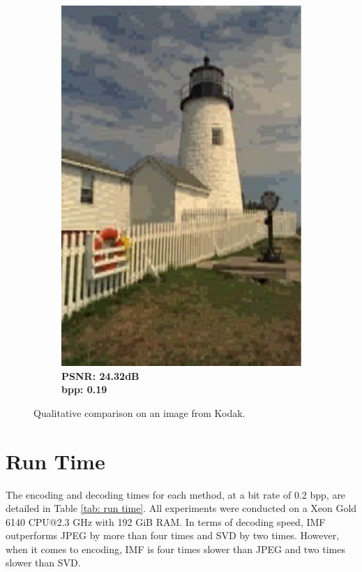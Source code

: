 \begin{figure}[t]
\begin{subfigure}{.2\textwidth}
		\includegraphics[width=.95\textwidth]{figures/kodim19_IMF_bpp_0.201_psnr_24.327.pdf}
        \caption*{\tiny \textbf{PSNR: 24.32dB \\ bpp: 0.19}}
	\end{subfigure}
    \caption{Qualitative comparison on an image from Kodak.}
	\label{fig: qualitative_comparison_kodim19}
\end{figure}


\section{Run Time} \label{app: run time}

The encoding and decoding times for each method, at a bit rate of 0.2 bpp, are detailed in Table \ref{tab: run time}. All experiments were conducted on a Xeon Gold 6140 CPU@2.3 GHz with 192 GiB RAM. In terms of decoding speed, IMF outperforms JPEG by more than four times and SVD by two times. However, when it comes to encoding, IMF is four times slower than JPEG and two times slower than SVD.

